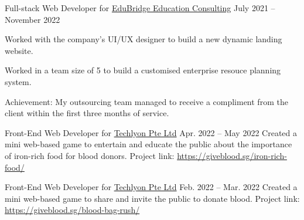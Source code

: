 \begin{cventries}

\cventry
{Full-stack Web Developer for \href{https://www.edubridge.co.id/}{EduBridge Education Consulting}} %
{} %
{} %
{July 2021 -- November 2022} %
{ %
\begin{cvitems}
\item {Worked with the company's UI/UX designer to build a new dynamic landing website.}
\item {Worked in a team size of 5 to build a customised enterprise resouce planning system.}
\end{cvitems}
\vspace{4mm}
Achievement: My outsourcing team managed to receive a compliment from the client within the first three months of service.
}




\cventry
{Front-End Web Developer for \href{https://helloakin.com/}{Techlyon Pte Ltd}} %
{} %
{} %
{Apr. 2022 -- May 2022} %
{ %
Created a mini web-based game to entertain and educate the public about the importance of iron-rich food for blood donors.
\linebreak
Project link: \href{https://giveblood.sg/iron-rich-food/}{https://giveblood.sg/iron-rich-food/}
}


\cventry
{Front-End Web Developer for \href{https://helloakin.com/}{Techlyon Pte Ltd}} %
{} %
{} %
{Feb. 2022 -- Mar. 2022} %
{ %
Created a mini web-based game to share and invite the public to donate blood.
\linebreak
Project link: \href{https://giveblood.sg/blood-bag-rush/}{https://giveblood.sg/blood-bag-rush/}
}


\end{cventries}
